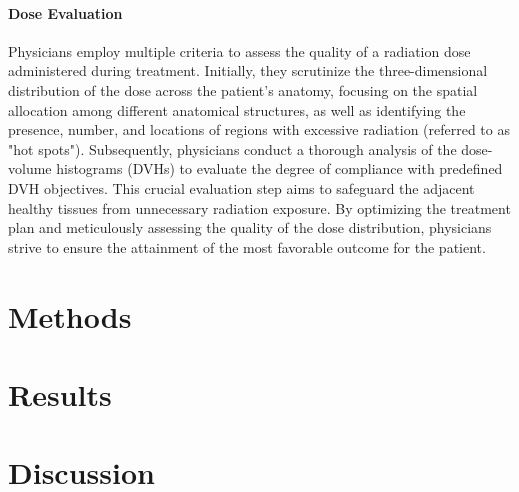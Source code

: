 \documentclass[a4paper]{article}
\begin{document}
	\paragraph{Dose Evaluation}
	Physicians employ multiple criteria to assess the quality of a radiation dose administered during treatment.
	Initially, they scrutinize the three-dimensional distribution of the dose across the patient's anatomy, focusing on the spatial allocation among different anatomical structures, as well as identifying the presence, number, and locations of regions with excessive radiation (referred to as "hot spots").
	Subsequently, physicians conduct a thorough analysis of the dose-volume histograms (DVHs) to evaluate the degree of compliance with predefined DVH objectives. This crucial evaluation step aims to safeguard the adjacent healthy tissues from unnecessary radiation exposure.
	By optimizing the treatment plan and meticulously assessing the quality of the dose distribution, physicians strive to ensure the attainment of the most favorable outcome for the patient.
	
	
	
	\section{Methods}
	
	\section{Results}
	
	\section{Discussion}
	
	
\end{document}
